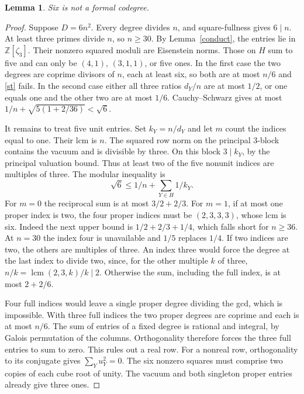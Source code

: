 \documentclass[11pt]{amsart}
\numberwithin{equation}{section}
\newtheorem{lemma}[theorem]{Lemma}
\begin{document}
\begin{lemma}\label{six}
Six is not a formal codegree.
\end{lemma}
\begin{proof}
Suppose $D=6n^2$. Every degree divides $n$, and square-fullness
gives $6\mid n$. At least three primes divide $n$, so $n\ge30$.
By Lemma~\ref{conduct}, the entries lie in $\mathbb Z[\zeta_3]$.
Their nonzero squared moduli are Eisenstein norms. Those on $H$
sum to five and can only be $(4,1)$, $(3,1,1)$, or five ones.
In the first case the two degrees are coprime divisors of $n$,
each at least six, so both are at most $n/6$ and \eqref{st} fails.
In the second case either all three ratios $d_Y/n$ are at most
$1/2$, or one equals one and the other two are at most $1/6$.
Cauchy--Schwarz gives at most $1/n+\sqrt{5(1+2/36)}<\sqrt6$.

It remains to treat five unit entries. Set $k_Y=n/d_Y$ and let $m$
count the indices equal to one. Their lcm is $n$. The squared row
norm on the principal $3$-block contains the vacuum and is divisible
by three. On this block $3\mid k_Y$, by the principal valuation
bound. Thus at least two of the five nonunit indices are multiples
of three. The modular inequality is
\[
            \sqrt6\le1/n+\sum_{Y\in H}1/k_Y.
\]
For $m=0$ the reciprocal sum is at most $3/2+2/3$. For $m=1$,
if at most one proper index is two, the four proper indices must
be $(2,3,3,3)$, whose lcm is six. Indeed the next upper bound is
$1/2+2/3+1/4$, which falls short for $n\ge36$. At $n=30$ the
index four is unavailable and $1/5$ replaces $1/4$. If two indices
are two, the others are multiples of three. An index three would
force the degree at the last index to divide two, since, for the other multiple $k$ of three,
$n/ k=\operatorname{lcm}(2,3,k)/k\mid2$. Otherwise the sum,
including the full index, is at most $2+2/6$.

Four full indices would leave a single proper degree dividing the
gcd, which is impossible. With three full indices the two proper
degrees are coprime and each is at most $n/6$. The sum of entries
of a fixed degree is rational and integral, by Galois permutation
of the columns. Orthogonality therefore forces the three full entries
to sum to zero. This rules out a real row. For a nonreal row,
orthogonality to its conjugate gives $\sum_Y u_Y^2=0$. The six
nonzero squares must comprise two copies of each cube root of unity.
The vacuum and both singleton proper entries already give three ones.


\end{proof}
\end{document}

